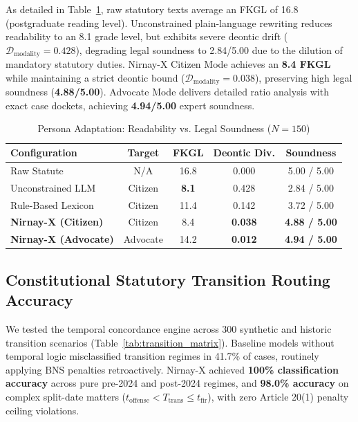 \documentclass[conference]{IEEEtran}
\begin{document}
As detailed in Table~\ref{tab:persona}, raw statutory texts average an FKGL of 16.8 (postgraduate reading level). Unconstrained plain-language rewriting reduces readability to an 8.1 grade level, but exhibits severe deontic drift ($\mathcal{D}_{\text{modality}} = 0.428$), degrading legal soundness to 2.84/5.00 due to the dilution of mandatory statutory duties. Nirnay-X Citizen Mode achieves an \textbf{8.4 FKGL} while maintaining a strict deontic bound ($\mathcal{D}_{\text{modality}} = 0.038$), preserving high legal soundness (\textbf{4.88/5.00}). Advocate Mode delivers detailed ratio analysis with exact case dockets, achieving \textbf{4.94/5.00} expert soundness.

\begin{table}[!t]
\caption{Persona Adaptation: Readability vs. Legal Soundness ($N=150$)}
\label{tab:persona}
\centering
\small
\begin{tabularx}{\columnwidth}{lcccc}
\toprule
\textbf{Configuration} & \textbf{Target} & \textbf{FKGL} & \textbf{Deontic Div.} & \textbf{Soundness} \\
\midrule
Raw Statute & N/A & 16.8 & 0.000 & 5.00 / 5.00 \\
Unconstrained LLM & Citizen & \textbf{8.1} & 0.428 & 2.84 / 5.00 \\
Rule-Based Lexicon & Citizen & 11.4 & 0.142 & 3.72 / 5.00 \\
\midrule
\textbf{Nirnay-X (Citizen)} & Citizen & 8.4 & \textbf{0.038} & \textbf{4.88 / 5.00} \\
\textbf{Nirnay-X (Advocate)} & Advocate & 14.2 & \textbf{0.012} & \textbf{4.94 / 5.00} \\
\bottomrule
\end{tabularx}
\end{table}

\subsection{Constitutional Statutory Transition Routing Accuracy}
We tested the temporal concordance engine across 300 synthetic and historic transition scenarios (Table~\ref{tab:transition_matrix}). Baseline models without temporal logic misclassified transition regimes in 41.7\% of cases, routinely applying BNS penalties retroactively. Nirnay-X achieved \textbf{100\% classification accuracy} across pure pre-2024 and post-2024 regimes, and \textbf{98.0\% accuracy} on complex split-date matters ($t_{\text{offense}} < T_{\text{trans}} \le t_{\text{fir}}$), with zero Article 20(1) penalty ceiling violations.
\end{document}
